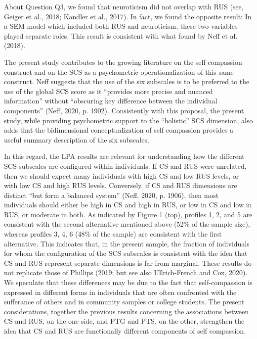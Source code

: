 \documentclass[
  english,
  man,floatsintext]{apa7}
\begin{document}
About Question Q3, we found that neuroticism did not overlap with RUS (see, Geiger et al., 2018; Kandler et al., 2017). In fact, we found the opposite result: In a SEM model which included both RUS and neuroticism, these two variables played separate roles. This result is consistent with what found by Neff et al. (2018).

The present study contributes to the growing literature on the self compassion construct and on the SCS as a psychometric operationalization of this same construct. Neff suggests that the use of the six subscales is to be preferred to the use of the global SCS score as it ``provides more precise and nuanced information'' without ``obscuring key difference between the individual components'' (Neff, 2020, p. 1902). Consistently with this proposal, the present study, while providing psychometric support to the ``holistic'' SCS dimension, also adds that the bidimensional conceptualization of self compassion provides a useful summary description of the six subscales.

In this regard, the LPA results are relevant for understanding how the different SCS subscales are configured within individuals. If CS and RUS were unrelated, then we should expect many individuals with high CS and low RUS levels, or with low CS and high RUS levels. Conversely, if CS and RUS dimensions are distinct ``but form a balanced system'' (Neff, 2020, p. 1906), then most individuals should either be high in CS and high in RUS, or low in CS and low in RUS, or moderate in both. As indicated by Figure 1 (top), profiles 1, 2, and 5 are consistent with the second alternative mentioned above (52\% of the sample size), whereas profiles 3, 4, 6 (48\% of the sample) are consistent with the first alternative. This indicates that, in the present sample, the fraction of individuals for whom the configuration of the SCS subscales is consistent with the idea that CS and RUS represent separate dimensions is far from marginal. These results do not replicate those of Phillips (2019; but see also Ullrich-French and Cox, 2020). We speculate that these differences may be due to the fact that self-compassion is expressed in different forms in individuals that are often confronted with the sufferance of others and in community samples or college students. The present considerations, together the previous results concerning the associations between CS and RUS, on the one side, and PTG and PTS, on the other, strengthen the idea that CS and RUS are functionally different components of self compassion.
\end{document}
